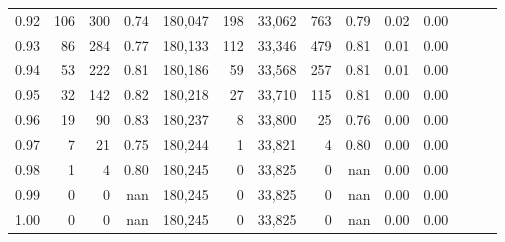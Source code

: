 \begin{tabular}{rrrrrrrrrrrrrr}
0.92 &    106 &  300 &  0.74 &  180,047 &      198 &  33,062 &     763 &  0.79 &  0.02 &      0.00 \\
0.93 &     86 &  284 &  0.77 &  180,133 &      112 &  33,346 &     479 &  0.81 &  0.01 &      0.00 \\
0.94 &     53 &  222 &  0.81 &  180,186 &       59 &  33,568 &     257 &  0.81 &  0.01 &      0.00 \\
0.95 &     32 &  142 &  0.82 &  180,218 &       27 &  33,710 &     115 &  0.81 &  0.00 &      0.00 \\
0.96 &     19 &   90 &  0.83 &  180,237 &        8 &  33,800 &      25 &  0.76 &  0.00 &      0.00 \\
0.97 &      7 &   21 &  0.75 &  180,244 &        1 &  33,821 &       4 &  0.80 &  0.00 &      0.00 \\
0.98 &      1 &    4 &  0.80 &  180,245 &        0 &  33,825 &       0 &   nan &  0.00 &      0.00 \\
0.99 &      0 &    0 &   nan &  180,245 &        0 &  33,825 &       0 &   nan &  0.00 &      0.00 \\
1.00 &      0 &    0 &   nan &  180,245 &        0 &  33,825 &       0 &   nan &  0.00 &      0.00 \\
\bottomrule
\end{tabular}
